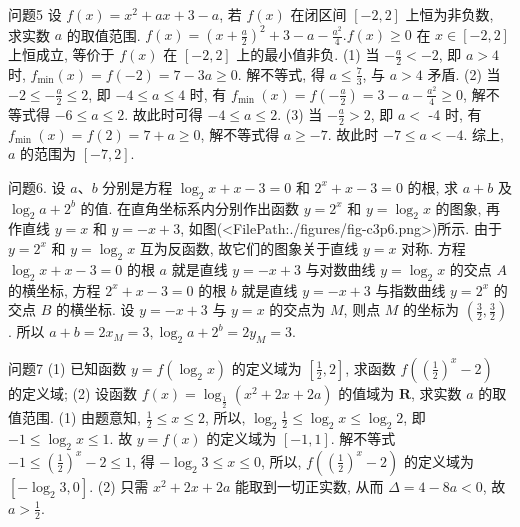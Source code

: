 问题5 设 $f(x)=x^2+a x+3-a$, 若 $f(x)$ 在闭区间 $[-2,2]$ 上恒为非负数, 求实数 $a$ 的取值范围.
$f(x)=\left(x+\frac{a}{2}\right)^2+3-a-\frac{a^2}{4} . f(x) \geqslant 0$ 在 $x \in[-2,2]$ 上恒成立, 等价于 $f(x)$ 在 $[-2,2]$ 上的最小值非负.
(1) 当 $-\frac{a}{2}<-2$, 即 $a>4$ 时, $f_{\min }(x)=f(-2)=7-3 a \geqslant 0$. 解不等式, 得 $a \leqslant \frac{7}{3}$, 与 $a>4$ 矛盾.
(2) 当 $-2 \leqslant-\frac{a}{2} \leqslant 2$, 即 $-4 \leqslant a \leqslant 4$ 时, 有 $f_{\text {min }}(x)=f\left(-\frac{a}{2}\right)=3-a-\frac{a^2}{4} \geqslant 0$, 解不等式得 $-6 \leqslant a \leqslant 2$. 故此时可得 $-4 \leqslant a \leqslant 2$. 
(3) 当 $-\frac{a}{2}>2$, 即 $a<$ -4 时, 有 $f_{\text {min }}(x)=f(2)=7+a \geqslant 0$, 解不等式得 $a \geqslant-7$. 故此时 $-7 \leqslant a<-4$. 综上, $a$ 的范围为 $[-7,2]$.



问题6. 设 $a 、 b$ 分别是方程 $\log _2 x+x-3=0$ 和 $2^x+x-3=0$ 的根, 求 $a+b$ 及 $\log _2 a+2^b$ 的值.
在直角坐标系内分别作出函数 $y=2^x$ 和 $y=\log _2 x$ 的图象, 再作直线 $y=x$ 和 $y=-x+3$, 如图(<FilePath:./figures/fig-c3p6.png>)所示.
由于 $y=2^x$ 和 $y=\log _2 x$ 互为反函数, 故它们的图象关于直线 $y=x$ 对称.
方程 $\log _2 x+x-3=0$ 的根 $a$ 就是直线 $y=-x+3$ 与对数曲线 $y=\log _2 x$ 的交点 $A$ 的横坐标, 方程 $2^x+x-3=0$ 的根 $b$ 就是直线 $y=-x+3$ 与指数曲线 $y=2^x$ 的交点 $B$ 的横坐标.
设 $y=-x+3$ 与 $y=x$ 的交点为 $M$, 则点 $M$ 的坐标为 $\left(\frac{3}{2}, \frac{3}{2}\right)$. 所以 $a+b=2 x_M=3, \log _2 a+2^b= 2 y_M=3$.



问题7 (1) 已知函数 $y=f\left(\log _2 x\right)$ 的定义域为 $\left[\frac{1}{2}, 2\right]$, 求函数 $f\left(\left(\frac{1}{2}\right)^x-2\right)$ 的定义域;
(2) 设函数 $f(x)=\log _{\frac{1}{2}}\left(x^2+2 x+2 a\right)$ 的值域为 $\mathbf{R}$, 求实数 $a$ 的取值范围.
(1) 由题意知, $\frac{1}{2} \leqslant x \leqslant 2$, 所以, $\log _2 \frac{1}{2} \leqslant \log _2 x \leqslant \log _2 2$, 即 $-1 \leqslant \log _2 x \leqslant 1$. 故 $y=f(x)$ 的定义域为 $[-1,1]$. 解不等式 $-1 \leqslant\left(\frac{1}{2}\right)^x-2 \leqslant 1$, 得 $-\log _2 3 \leqslant x \leqslant 0$, 所以, $f\left(\left(\frac{1}{2}\right)^x-2\right)$ 的定义域为 $\left[-\log _2 3,0\right]$.
(2) 只需 $x^2+2 x+2 a$ 能取到一切正实数, 从而 $\Delta=4-8 a<0$, 故 $a>\frac{1}{2}$.



